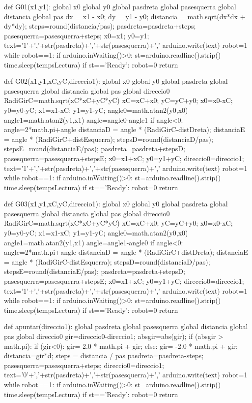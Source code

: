 \begin{python}
	def G01(x1,y1):
		global x0
		global y0
		global pasdreta
		global pasesquerra
		global distancia
		global pas
		dx = x1 - x0;
		dy = y1 - y0;
		distancia = math.sqrt(dx*dx + dy*dy);
		steps=round(distancia/pas);
		pasdreta=pasdreta+steps;
		pasesquerra=pasesquerra+steps;
		x0=x1;
		y0=y1;
		text='1'+','+str(pasdreta)+','+str(pasesquerra)+','
		arduino.write(text)
		robot=1
		while robot==1:
			if arduino.inWaiting()>0:
				st=arduino.readline().strip()
				time.sleep(tempsLectura)
				if st=='Ready':
					robot=0
		return
	
	def G02(x1,y1,xC,yC,direccio1):
		global x0
		global y0
		global pasdreta
		global pasesquerra
		global distancia
		global pas
		global direccio0
		RadiGirC=math.sqrt(xC*xC+yC*yC)
		xC=xC+x0;
		yC=yC+y0;
		x0=x0-xC;
		y0=y0-yC;
		x1=x1-xC;
		y1=y1-yC;
		angle0=math.atan2(y0,x0)
		angle1=math.atan2(y1,x1)
		angle=angle0-angle1
		if angle<0:
			angle=2*math.pi+angle
		distanciaD = angle * (RadiGirC-distDreta);
		distanciaE = angle * (RadiGirC+distEsquerra);
		stepsD=round(distanciaD/pas);
		stepsE=round(distanciaE/pas);
		pasdreta=pasdreta+stepsD;
		pasesquerra=pasesquerra+stepsE;
		x0=x1+xC;
		y0=y1+yC;
		direccio0=direccio1;
		text='1'+','+str(pasdreta)+','+str(pasesquerra)+','
		arduino.write(text)
		robot=1
		while robot==1:
			if arduino.inWaiting()>0:
				st=arduino.readline().strip()
				time.sleep(tempsLectura)
				if st=='Ready':
					robot=0
		return
	
	def G03(x1,y1,xC,yC,direccio1):
		global x0
		global y0
		global pasdreta
		global pasesquerra
		global distancia
		global pas
		global direccio0
		RadiGirC=math.sqrt(xC*xC+yC*yC)
		xC=xC+x0;
		yC=yC+y0;
		x0=x0-xC;
		y0=y0-yC;
		x1=x1-xC;
		y1=y1-yC;
		angle0=math.atan2(y0,x0)
		angle1=math.atan2(y1,x1)
		angle=angle1-angle0
		if angle<0:
			angle=2*math.pi+angle
		distanciaD = angle * (RadiGirC+distDreta);
		distanciaE = angle * (RadiGirC-distEsquerra);
		stepsD=round(distanciaD/pas);
		stepsE=round(distanciaE/pas);
		pasdreta=pasdreta+stepsD;
		pasesquerra=pasesquerra+stepsE;
		x0=x1+xC;
		y0=y1+yC;
		direccio0=direccio1;
		text='1'+','+str(pasdreta)+','+str(pasesquerra)+','
		arduino.write(text)
		robot=1
		while robot==1:
			if arduino.inWaiting()>0:
				st=arduino.readline().strip()
				time.sleep(tempsLectura)
				if st=='Ready':
					robot=0
		return
	
	def apuntar(direccio1):
		global pasdreta
		global pasesquerra
		global distancia
		global pas
		global direccio0
		gir=direccio0-direccio1;
		absgir=abs(gir);
		if (absgir > math.pi):
			if (gir<0):
				gir= 2.0 * math.pi + gir;
			else:
				gir= -2.0 * math.pi + gir;
		distancia=gir*d;
		steps = distancia / pas
		pasdreta=pasdreta-steps;
		pasesquerra=pasesquerra+steps;
		direccio0=direccio1;
		text='0'+','+str(pasdreta)+','+str(pasesquerra)+','
		arduino.write(text)
		robot=1
		while robot==1:
			if arduino.inWaiting()>0:
				st=arduino.readline().strip()
				time.sleep(tempsLectura)
				if st=='Ready':
					robot=0
		return
	

\end{python}
